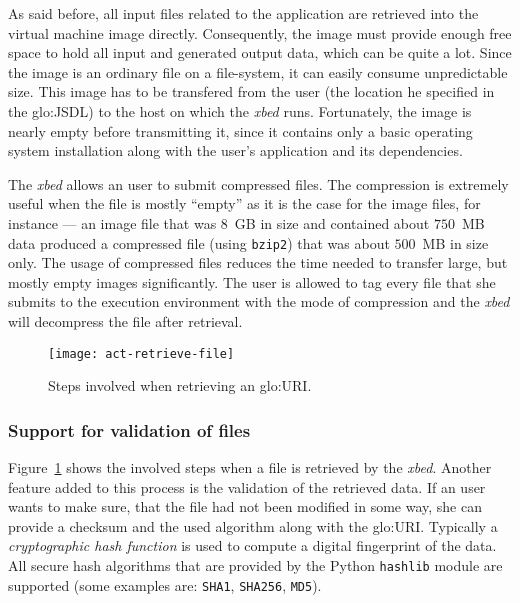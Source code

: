 As said before,  all input files related to  the application are retrieved
into  the virtual  machine image  directly. Consequently,  the  image must
provide enough  free space  to hold all  input and generated  output data,
which  can be  quite a  lot. Since  the  image is  an ordinary  file on  a
file-system, it can  easily consume unpredictable size. This  image has to
be  transfered  from  the user  (\ie  the  location  he specified  in  the
\gls{glo:JSDL}) to  the host on  which the \emph{xbed}  runs. Fortunately,
the image is nearly empty before transmitting it, since it contains only a
basic operating system installation  along with the user's application and
its dependencies.

The \emph{xbed} allows an user to submit compressed files. The compression
is extremely  useful when the file is  mostly ``empty'' as it  is the case
for the  image files, for  instance --- an  image file that was  $8$~GB in
size and contained  about $750$~MB data produced a  compressed file (using
\texttt{bzip2})  that was  about  $500$~MB  in size  only.   The usage  of
compressed files  reduces the  time needed to  transfer large,  but mostly
empty images significantly. The user is allowed to tag every file that she
submits to the execution environment  with the mode of compression and the
\emph{xbed} will decompress the file after retrieval.

\begin{figure}[ht]
  \centering
  \texttt{[image: act-retrieve-file]}
  \caption[File  Retrieval  Activity]{Steps  involved when  retrieving  an
    \gls{glo:URI}.}
  \label{fig:act-retrieve-file}
\end{figure}

\subsubsection{Support for validation of files}

Figure~\ref{fig:act-retrieve-file} shows the involved steps when a file is
retrieved by the \emph{xbed}. Another feature added to this process is the
validation of the retrieved data. If  an user wants to make sure, that the
file had not been modified in some way, she can provide a checksum and the
used    algorithm   along   with    the   \gls{glo:URI}.     Typically   a
\emph{cryptographic  hash   function}  is   used  to  compute   a  digital
fingerprint of the  data. All secure hash algorithms  that are provided by
the  Python  \texttt{hashlib} module  are  supported  (some examples  are:
\texttt{SHA1}, \texttt{SHA256}, \texttt{MD5}).

